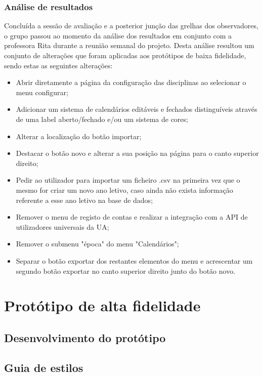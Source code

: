 \documentclass[11pt, twoside]{report}
\begin{document}
	\subsubsection{Análise de resultados}
	Concluída a sessão de avaliação e a posterior junção das grelhas dos observadores, o grupo passou ao momento da análise dos resultados em conjunto com a professora Rita durante a reunião semanal do projeto. Desta análise resultou um conjunto de alterações que foram aplicadas aos protótipos de baixa fidelidade, sendo estas as seguintes alterações:
	
	\begin{itemize}
		\item Abrir diretamente a página da configuração das disciplinas ao selecionar o menu configurar;
		\item Adicionar um sistema de calendários editáveis e fechados distinguíveis através de uma label aberto/fechado e/ou um sistema de cores;
		\item Alterar a localização do botão importar;
		\item Destacar o botão novo e alterar a sua posição na página para o canto superior direito;
		\item Pedir ao utilizador para importar um ficheiro .csv na primeira vez que o mesmo for criar um novo ano letivo, caso ainda não exista informação referente a esse ano letivo na base de dados;
		\item Remover o menu de registo de contas e realizar a integração com a API de utilizadores universais da UA;
		\item Remover o submenu "época" do menu "Calendários";		
		\item Separar o botão exportar dos restantes elementos do menu e acrescentar um segundo botão exportar no canto superior direito junto do botão novo.
		
	\end{itemize}
	
	\section{Protótipo de alta fidelidade}
	\subsection{Desenvolvimento do protótipo}
	\subsection{Guia de estilos}
\end{document}
